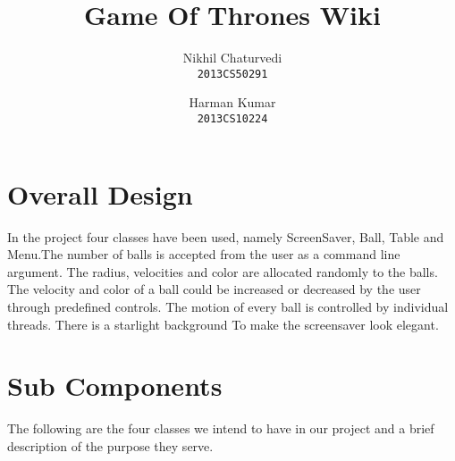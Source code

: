 \documentclass[]{article}
\begin{document}
\author{
  Nikhil Chaturvedi\\
  \texttt{2013CS50291}
  \and
  Harman Kumar\\
  \texttt{2013CS10224}
}

\title{Game Of Thrones Wiki}
\maketitle



\section{Overall Design}

\begin{flushleft}

In the project four classes have been used, namely ScreenSaver, Ball, Table and Menu.The number of balls is accepted from the user as a command line argument. The radius, velocities and color are allocated randomly to the balls. The velocity and color of a ball could be increased or decreased by the user through predefined controls. The motion of every ball is controlled by individual threads. There is a starlight background To make the screensaver look elegant.

\end{flushleft} 


\section{Sub Components}

The following are the four classes we intend to have in our project and a brief description of the purpose they serve.
\end{document}
